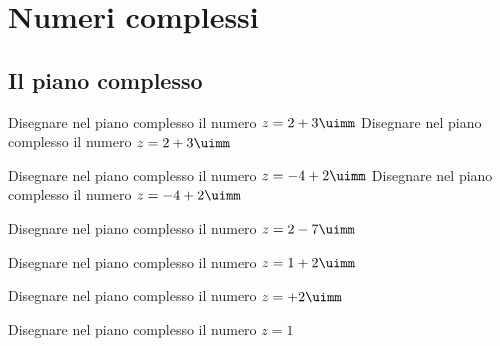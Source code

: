 \chapter{Numeri complessi}
\label{cha:numericomplessibase}
 \section{Il piano complesso}
 \begin{exercise}
Disegnare nel piano complesso il numero $z=2+3\uimm$
\tcblower
Disegnare nel piano complesso il numero $z=2+3\uimm$
\begin{center}

\label{fig:disegnopianocomplesso01}
\end{center}
 \end{exercise}
  \begin{exercise}
  	Disegnare nel piano complesso il numero $z=-4+2\uimm$
  	\tcblower
  	Disegnare nel piano complesso il numero $z=-4+2\uimm$
  	\begin{center}
  		
  		\label{fig:disegnopianocomplesso02}
  	\end{center}
  \end{exercise}
\begin{exercise}[no solution]
	Disegnare nel piano complesso il numero $z=2-7\uimm$
\end{exercise}
\begin{exercise}[no solution]
	Disegnare nel piano complesso il numero $z=1+2\uimm$
\end{exercise}
\begin{exercise}[no solution]
Disegnare nel piano complesso il numero $z=+2\uimm$
\end{exercise}
\begin{exercise}[no solution]
	Disegnare nel piano complesso il numero $z=1$
\end{exercise}

